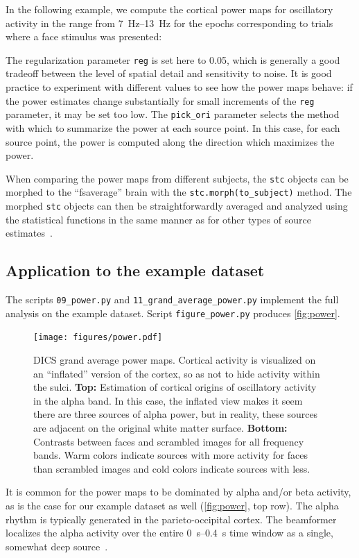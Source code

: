 \documentclass[utf8]{frontiersSCNS}
\renewcommand{\cite}[1]{~\citep{#1}}
\newcommand{\code}[1]{\lstinline{#1}}
\begin{document}
In the following example, we compute the cortical power maps for oscillatory activity in the range from \SIrange{7}{13}{\hertz} for the epochs corresponding to trials where a face stimulus was presented:

The regularization parameter \code{reg} is set here to 0.05, which is generally a good tradeoff between the level of spatial detail and sensitivity to noise.
It is good practice to experiment with different values to see how the power maps behave: if the power estimates change substantially for small increments of the \code{reg} parameter, it may be set too low.
The \code{pick_ori} parameter selects the method with which to summarize the power at each source point.
In this case, for each source point, the power is computed along the direction which maximizes the power.

When comparing the power maps from different subjects, the \code{stc} objects can be morphed to the ``fsaverage'' brain with the \code{stc.morph(to_subject)} method.
The morphed \code{stc} objects can then be straightforwardly averaged and analyzed using the statistical functions in the same manner as for other types of source estimates\cite{Jas2017}.

\subsection{Application to the example dataset}

The scripts \code{09_power.py} and \code{11_grand_average_power.py} implement the full analysis on the example dataset.
Script \code{figure_power.py} produces \autoref{fig:power}.

\begin{figure}
\texttt{[image: figures/power.pdf]}
\caption{DICS grand average power maps. Cortical activity is visualized on an ``inflated'' version of the cortex, so as not to hide activity within the sulci. \textbf{Top:} Estimation of cortical origins of oscillatory activity in the alpha band. In this case, the inflated view makes it seem there are three sources of alpha power, but in reality, these sources are adjacent on the original white matter surface. \textbf{Bottom:} Contrasts between faces and scrambled images for all frequency bands. Warm colors indicate sources with more activity for faces than scrambled images and cold colors indicate sources with less.}
\label{fig:power}
\end{figure}

It is common for the power maps to be dominated by alpha and/or beta activity, as is the case for our example dataset as well (\autoref{fig:power}, top row).
The alpha rhythm is typically generated in the parieto-occipital cortex.
The beamformer localizes the alpha activity over the entire \SIrange{0}{0.4}{\second} time window as a single, somewhat deep source\cite{Ciulla1999}.
\end{document}
